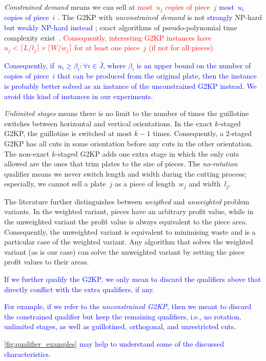\documentclass[smallextended]{svjour3}       %
\newif\iffinalversion
\newcommand{\newtext}[1]{\iffinalversion%
#1%
\else%
\textcolor{blue}{#1}%
\fi%
}
\newcommand{\oldtext}[1]{\iffinalversion%
\else%
\textcolor{red}{#1}%
\fi%
}
\begin{document}
\emph{Constrained demand} means we can sell at \oldtext{most~\(u_j\) copies of piece~\(j\)}\newtext{most~\(u_i\) copies of piece~\(i\)}.
The G2KP with \emph{unconstrained demand} is not \newtext{strongly} NP-hard \newtext{but weakly NP-hard instead}; exact algorithms of pseudo-polynomial time complexity exist~\cite{beasley:1985}.
\oldtext{Consequently, interesting G2KP instances have~\(u_j < \lceil L / l_j \rceil \times \lceil W / w_j \rceil \) for at least one piece~\(j\) (if not for all pieces).}
\newtext{Consequently, if~\(u_i \geq \beta_i : \forall i \in \bar{J}\), where \(\beta_i\) is an upper bound on the number of copies of piece~\(i\) that can be produced from the original plate, then the instance is probably better solved as an instance of the unconstrained G2KP instead. We avoid this kind of instances in our experiments.}
\emph{Unlimited stages} means there is no limit to the number of times the guillotine switches between horizontal and vertical orientations.
In the exact \(k\)-staged G2KP, the guillotine is switched at most \(k-1\) times.
Consequently, a 2-staged G2KP has all cuts in some orientation before any cuts in the other orientation.
The non-exact \(k\)-staged G2KP adds one extra stage in which the only cuts allowed are the ones that trim plates to the size of pieces.
The \emph{no-rotation} qualifier means we never switch length and width during the cutting process; especially, we cannot sell a plate~\(j\) as a piece of length~\(w_j\) and width~\(l_j\).

The literature further distinguishes between \emph{weigthed} and \emph{unweighted} problem variants.
In the weighted variant, pieces have an arbitrary profit value, while in the unweighted variant the profit value is always equivalent to the piece area.
Consequently, the unweighted variant is equivalent to minimising waste and is a particular case of the weighted variant.
Any algorithm that solves the weighted variant (as is our case) can solve the unweighted variant by setting the piece profit values to their areas.

\newtext{If we further qualify the G2KP, we only mean to discard the qualifiers above that directly conflict with the extra qualifiers, if any.}
\newtext{For example, if we refer to the \emph{unconstrained G2KP}, then we meant to discard the constrained qualifier but keep the remaining qualifiers, i.e., no rotation, unlimited stages, as well as guillotined, orthogonal, and unrestricted cuts.}
\newtext{\autoref{fig:qualifier_examples} may help to understand some of the discussed characteristics.}
\end{document}
